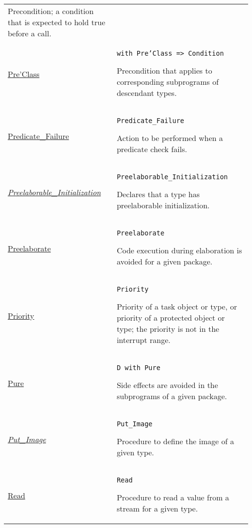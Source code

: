 \documentclass[english]{article}
\begin{document}
\begin{scriptsize}
\begin{multicols*}{3}
\begin{tabular}{@{}p{2cm}p{6.5cm}}
   Precondition; a condition that is expected to hold true before a call.\\

   \href{http://www.ada-auth.org/standards/22rm/html/RM-6-1-1.html}{Pre'Class} & \texttt{with Pre'Class => Condition}

   Precondition that applies to corresponding subprograms of descendant types. \\

   \href{http://www.ada-auth.org/standards/22rm/html/RM-3-2-4.html}{Predicate\_Failure} & \texttt{Predicate\_Failure}

   Action to be performed when a predicate check fails.\\

   \href{http://www.ada-auth.org/standards/22rm/html/RM-10-2-1.html}{\textit{Preelaborable\_Initialization}} & \texttt{Preelaborable\_Initialization}

   Declares that a type has preelaborable initialization.\\

   \href{http://www.ada-auth.org/standards/22rm/html/RM-10-2-1.html}{Preelaborate} & \texttt{Preelaborate}

   Code execution during elaboration is avoided for a given package.\\

   \href{http://www.ada-auth.org/standards/22rm/html/RM-D-1.html}{Priority} & \texttt{Priority}

   Priority of a task object or type, or priority of a protected object or type; the priority is not in the interrupt range.\\

   \href{http://www.ada-auth.org/standards/22rm/html/RM-10-2-1.html}{Pure} & \texttt{D with Pure}

   Side effects are avoided in the subprograms of a given package.\\

   \href{http://www.ada-auth.org/standards/22rm/html/RM-4-10.html}{\textit{Put\_Image}} & \texttt{Put\_Image}

   Procedure to define the image of a given type.\\

   \href{http://www.ada-auth.org/standards/22rm/html/RM-13-13-2.html}{Read} & \texttt{Read}

   Procedure to read a value from a stream for a given type.\\


\end{tabular}
\end{multicols*}
\end{scriptsize}
\end{document}
